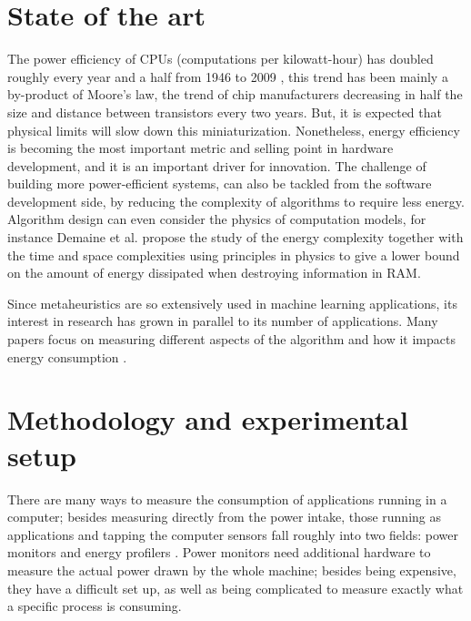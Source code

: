 \documentclass[a4paper,twoside]{article}
\begin{document}
\section{State of the art}

The power efficiency of CPUs (computations per kilowatt-hour) has doubled
roughly every year and a half from 1946 to 2009 \cite{koomey2011web}, this trend
has been mainly a by-product of Moore's law, the trend of chip manufacturers
decreasing in half the size and distance between transistors every two
years. But, it is expected that physical limits will slow down this
miniaturization. Nonetheless, energy efficiency is becoming the most important
metric and selling point in hardware development, and it is an important driver
for innovation. The challenge of building more power-efficient systems, can also
be tackled from the software development side, by reducing the complexity of
algorithms to require less energy. Algorithm design can even consider the
physics of computation models, for instance Demaine et
al. \cite{demaine2016energy} propose the study of the energy complexity together
with the time and space complexities using principles in physics to give a lower
bound on the amount of energy dissipated when destroying information in RAM.

Since metaheuristics are so extensively used in machine learning applications,
its interest in research has grown in parallel to its number of applications.
Many papers focus on measuring different aspects of the algorithm and how it
impacts energy consumption \cite{diaz2022population}.

\section{Methodology and experimental setup}
\label{sec:setup}

There are many ways to measure the consumption of applications running in a
computer; besides measuring directly from the power intake, those running as
applications and tapping the computer sensors fall roughly into two fields:
power monitors and energy profilers \cite{cruz21}. Power monitors need
additional hardware to measure the actual power drawn by the whole machine;
besides being expensive, they have a difficult set up, as well as being
complicated to measure exactly what a specific process is consuming.
\end{document}
